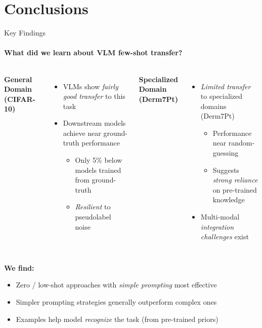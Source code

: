 \section{Conclusions}
\begin{frame}{Key Findings}
\framesubtitle{What did we learn about VLM few-shot transfer?}
  \vspace{-0.4em}
  \begin{columns}[T]
    \column{\customcolumnwidth}
      \textbf{General Domain (CIFAR-10)}
      \vspace{-0.2em}
      \begin{itemize}
        \item VLMs show \emph{fairly good transfer} to this task
        \item Downstream models achieve near ground-truth performance
        \begin{itemize}
          \item Only 5\% below models trained from ground-truth
          \item \emph{Resilient} to pseudolabel noise
        \end{itemize}
      \end{itemize}
    \column{\customcolumnwidth}
      \textbf{Specialized Domain (Derm7Pt)}
      \vspace{-0.2em}
      \begin{itemize}
        \item \emph{Limited transfer} to specialized domains (Derm7Pt)
        \begin{itemize}
          \item Performance near random-guessing
          \item Suggests \emph{strong reliance} on pre-trained knowledge
        \end{itemize}
        \item Multi-modal \emph{integration challenges} exist
      \end{itemize}
  \end{columns}
  \textbf{We find:}
  \begin{itemize}
    \item Zero / low-shot approaches with \emph{simple prompting} most effective
    \item Simpler prompting strategies generally outperform complex ones
    \item Examples help model \emph{recognize} the task (from pre-trained priors)~
  \end{itemize}
  \vspace{-0.4em}
  \blfootnote{\vspace{0.05em}}
\end{frame}
